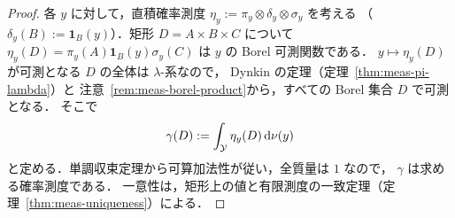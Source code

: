 \begin{proof}
  各 $y$ に対して，直積確率測度
  $\eta_y:=\pi_y\otimes\delta_y\otimes\sigma_y$ を考える
  （$\delta_y(B):=\mathbf{1}_B(y)$）．矩形 $D=A\times B\times C$ について
  $\eta_y(D)=\pi_y(A)\mathbf{1}_B(y)\sigma_y(C)$ は $y$ の Borel 可測関数である．
  $y\mapsto\eta_y(D)$ が可測となる $D$ の全体は $\lambda$-系なので，
  Dynkin の定理（定理~\ref{thm:meas-pi-lambda}）と
  注意~\ref{rem:meas-borel-product}から，すべての Borel 集合 $D$ で可測となる．
  そこで
  \[
    \gamma(D):=\int_{\mathcal{Y}}\eta_y(D)\,\mathrm{d}\nu(y)
  \]
  と定める．単調収束定理から可算加法性が従い，全質量は $1$ なので，
  $\gamma$ は求める確率測度である．
  一意性は，矩形上の値と有限測度の一致定理（定理~\ref{thm:meas-uniqueness}）による．
\end{proof}

